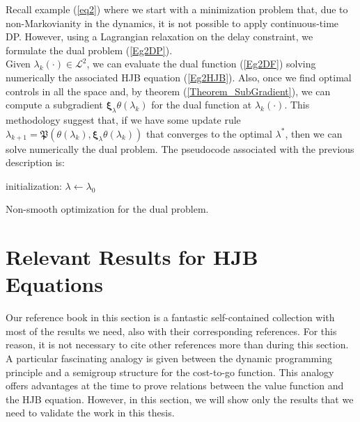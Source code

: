 Recall example (\ref{eq2}) where we start with a minimization problem that, due to non-Markovianity in the dynamics, it is not possible to apply continuous-time DP. However, using a Lagrangian relaxation on the delay constraint, we formulate the dual problem (\ref{Eg2DP}).\\
Given $\lambda_k(\cdot)\in\mathcal{L}^2$, we can evaluate the dual function (\ref{Eg2DF}) solving numerically the associated HJB equation (\ref{Eg2HJB}). Also, once we find optimal controls in all the space and, by theorem (\ref{Theorem_SubGradient}), we can compute a subgradient $\bm{\xi}_{\lambda}\theta(\lambda_k)$ for the dual function at $\lambda_k(\cdot)$. This methodology suggest that, if we have some update rule $\lambda_{k+1}=\mathfrak{P}(\theta(\lambda_k),\bm{\xi}_{\lambda}\theta(\lambda_k))$ that converges to the optimal $\lambda^*$, then we can solve numerically the dual problem. The pseudocode associated with the previous description is:
\begin{center}
\begin{algorithm}[H]
\SetAlgoLined
 initialization: $\lambda\leftarrow\lambda_0$\;
 \caption{Non-smooth optimization for the dual problem.}
\end{algorithm}
\end{center}

\section{Relevant Results for HJB Equations}

Our reference book in this section is a fantastic self-contained collection with most of the results we need, also with their corresponding references. For this reason, it is not necessary to cite other references more than \cite{fleming2006controlled} during this section.\\
A particular fascinating analogy is given between the dynamic programming principle and a semigroup structure for the cost-to-go function. This analogy offers advantages at the time to prove relations between the value function and the HJB equation. However, in this section, we will show only the results that we need to validate the work in this thesis.\\

